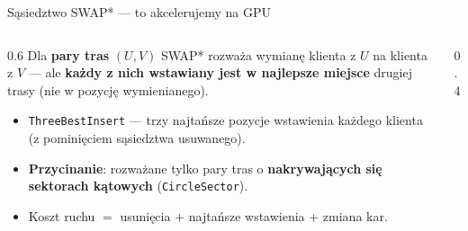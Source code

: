 \documentclass[aspectratio=169,11pt]{beamer}
\begin{document}
\begin{frame}{Sąsiedztwo SWAP* — to akcelerujemy na GPU}
  \begin{columns}[T]
    \begin{column}{0.6\textwidth}
      Dla \textbf{pary tras} $(U,V)$ SWAP* rozważa wymianę klienta z $U$ na klienta z $V$ — ale \textbf{każdy z nich wstawiany jest w najlepsze miejsce} drugiej trasy (nie w pozycję wymienianego).
      \vspace{0.5em}
      \begin{itemize}
        \item \texttt{ThreeBestInsert} — trzy najtańsze pozycje wstawienia każdego klienta (z pominięciem sąsiedztwa usuwanego).
        \item \textbf{Przycinanie}: rozważane tylko pary tras o \textbf{nakrywających się sektorach kątowych} (\texttt{CircleSector}).
        \item Koszt ruchu $=$ usunięcia $+$ najtańsze wstawienia $+$ zmiana kar.
      \end{itemize}
    \end{column}
    \begin{column}{0.4\textwidth}
      \centering
      \par{}
    \end{column}
  \end{columns}
\end{frame}
\end{document}
